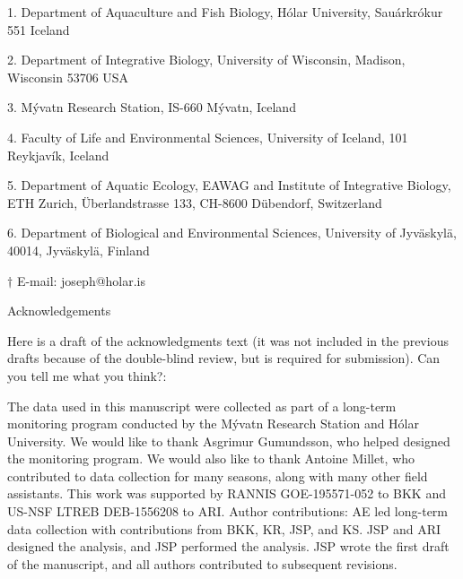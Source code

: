\author{
Joseph S. Phillips$^{1,2, \dagger}$ \\
\'{A}rni Einarsson$^{3,4}$ \\ 
Kasha Strickland$^{1}$ \\
Anthony R. Ives$^{2}$ \\
Bjarni K. Kristj\'{a}nsson$^{1}$ \\
Katja R\"{a}s\"{a}nen$^{5,6}$ 
}

\noindent{} 1. Department of Aquaculture and Fish Biology, 
H\'{o}lar University, Sau{\dh}\'{a}rkr\'{o}kur 551 Iceland

\noindent{} 2. Department of Integrative Biology, 
University of Wisconsin, Madison, Wisconsin 53706 USA

\noindent{} 3. M\'{y}vatn Research Station, IS-660 M\'{y}vatn, Iceland

\noindent{} 4. Faculty of Life and Environmental Sciences, 
              University of Iceland, 101 Reykjav\'{i}k, Iceland

\noindent{} 5. Department of Aquatic Ecology, EAWAG and 
Institute of Integrative Biology, ETH Zurich, 
\"{U}berlandstrasse 133, CH-8600 D\"{u}bendorf, Switzerland

\noindent{} 6. Department of Biological and Environmental Sciences, 
University of Jyv\"{a}skyl\"{a}, 40014, Jyv\"{a}skyl\"{a}, Finland

\noindent{} $\dagger$ E-mail: joseph@holar.is

Acknowledgements

Here is a draft of the acknowledgments text (it was not included in the previous drafts because of the double-blind review, but is required for submission). Can you tell me what you think?:

The data used in this manuscript were collected as part of a long-term monitoring program conducted by the M\'{y}vatn Research Station and H\'{o}lar University. We would like to thank Asgrimur Gu{\dh}mundsson, who helped designed the monitoring program. We would also like to thank Antoine Millet, who contributed to data collection for many seasons, along with many other field assistants. This work was supported by RANNIS GOE-195571-052 to BKK and US-NSF LTREB DEB-1556208 to ARI. Author contributions: AE led long-term data collection with contributions from BKK, KR, JSP, and KS. JSP and ARI designed the analysis, and JSP performed the analysis. JSP wrote the first draft of the manuscript, and all authors contributed to subsequent revisions. 

